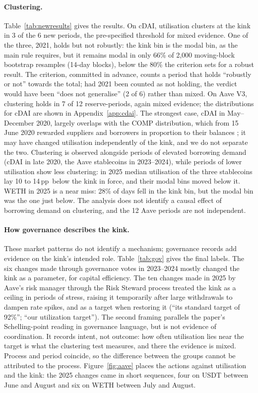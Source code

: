 \documentclass[11pt]{article}
\newcommand{\pp}{\,pp}
\begin{document}
\paragraph{Clustering.} Table~\ref{tab:newresults} gives the results. On cDAI, utilisation clusters at the kink in 3 of the 6 new periods, the pre-specified threshold for mixed evidence. One of the three, 2021, holds but not robustly: the kink bin is the modal bin, as the main rule requires, but it remains modal in only 66\% of 2,000 moving-block bootstrap resamples (14-day blocks), below the 80\% the criterion sets for a robust result. The criterion, committed in advance, counts a period that holds ``robustly or not'' towards the total; had 2021 been counted as not holding, the verdict would have been ``does not generalise'' (2 of 6) rather than mixed. On Aave V3, clustering holds in 7 of 12 reserve-periods, again mixed evidence; the distributions for cDAI are shown in Appendix~\ref{app:cdai}. The strongest case, cDAI in May--December 2020, largely overlaps with the COMP distribution, which from 15 June 2020 rewarded suppliers and borrowers in proportion to their balances \citep{wan2020comp}; it may have changed utilisation independently of the kink, and we do not separate the two. Clustering is observed alongside periods of elevated borrowing demand (cDAI in late 2020, the Aave stablecoins in 2023--2024), while periods of lower utilisation show less clustering: in 2025 median utilisation of the three stablecoins lay 10 to 14\pp\ below the kink in force, and their modal bins moved below it. WETH in 2025 is a near miss: 28\% of days fell in the kink bin, but the modal bin was the one just below. The analysis does not identify a causal effect of borrowing demand on clustering, and the 12 Aave periods are not independent.

\paragraph{How governance describes the kink.} These market patterns do not identify a mechanism; governance records add evidence on the kink's intended role. Table~\ref{tab:gov} gives the final labels. The six changes made through governance votes in 2023--2024 mostly changed the kink as a parameter, for capital efficiency. The ten changes made in 2025 by Aave's risk manager through the Risk Steward process treated the kink as a ceiling in periods of stress, raising it temporarily after large withdrawals to dampen rate spikes, and as a target when restoring it (``its standard target of 92\%''; ``our utilization target''). The second framing parallels the paper's Schelling-point reading in governance language, but is not evidence of coordination. It records intent, not outcome: how often utilisation lies near the target is what the clustering test measures, and there the evidence is mixed. Process and period coincide, so the difference between the groups cannot be attributed to the process. Figure~\ref{fig:aave} places the actions against utilisation and the kink: the 2025 changes came in short sequences, four on USDT between June and August and six on WETH between July and August.
\end{document}
